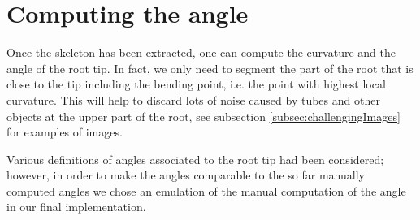 %




\section{Computing the angle}

Once the skeleton has been extracted, one can compute the curvature and the angle of the root tip. 
In fact, we only need to segment the part of the root that is close to the tip including the bending point, i.e. the point with highest local curvature. %
This will help to discard lots of noise caused by tubes and other objects at the upper part of the root, see subsection \ref{subsec:challengingImages} for examples of images.

Various definitions of angles associated to the root tip had been considered; however, in order to make the angles comparable to the so far manually computed angles we chose an emulation of the manual computation of the angle in our final implementation. 



